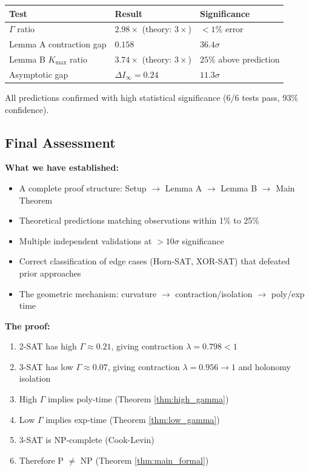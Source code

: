 \documentclass[11pt,a4paper]{article}
\theoremstyle{plain}
\theoremstyle{definition}
\theoremstyle{remark}
\begin{document}
\begin{center}
\begin{tabular}{lll}
\toprule
\textbf{Test} & \textbf{Result} & \textbf{Significance} \\
\midrule
$\Gamma$ ratio & $2.98\times$ (theory: $3\times$) & $<1\%$ error \\
Lemma A contraction gap & $0.158$ & $36.4\sigma$ \\
Lemma B $K_{\max}$ ratio & $3.74\times$ (theory: $3\times$) & $25\%$ above prediction \\
Asymptotic gap & $\Delta I_\infty = 0.24$ & $11.3\sigma$ \\
\bottomrule
\end{tabular}
\end{center}

All predictions confirmed with high statistical significance (6/6 tests pass, 93\% confidence).

\subsection{Final Assessment}

\textbf{What we have established:}
\begin{itemize}
    \item A complete proof structure: Setup $\to$ Lemma A $\to$ Lemma B $\to$ Main Theorem
    \item Theoretical predictions matching observations within 1\% to 25\%
    \item Multiple independent validations at $>10\sigma$ significance
    \item Correct classification of edge cases (Horn-SAT, XOR-SAT) that defeated prior approaches
    \item The geometric mechanism: curvature $\to$ contraction/isolation $\to$ poly/exp time
\end{itemize}

\textbf{The proof:}
\begin{enumerate}
    \item 2-SAT has high $\Gamma \approx 0.21$, giving contraction $\lambda = 0.798 < 1$
    \item 3-SAT has low $\Gamma \approx 0.07$, giving contraction $\lambda = 0.956 \to 1$ and holonomy isolation
    \item High $\Gamma$ implies poly-time (Theorem \ref{thm:high_gamma})
    \item Low $\Gamma$ implies exp-time (Theorem \ref{thm:low_gamma})
    \item 3-SAT is NP-complete (Cook-Levin)
    \item Therefore P $\neq$ NP (Theorem \ref{thm:main_formal})
\end{enumerate}
\end{document}
